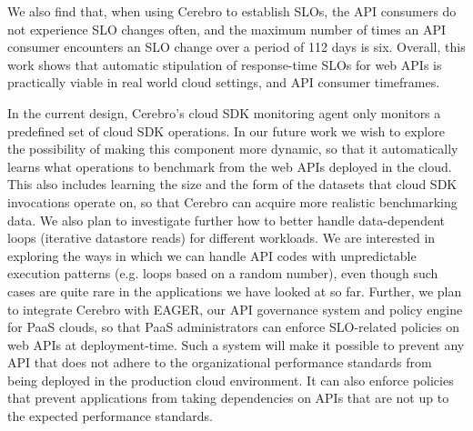 We also find that, when using Cerebro to establish SLOs, the API consumers do not 
experience SLO changes often, and the maximum
number of times an API consumer encounters an SLO change over a period of 112 days is six.
Overall, this work shows that automatic stipulation of response-time SLOs for web APIs is practically
viable in real world cloud settings, and API consumer timeframes.

In the current design, Cerebro's cloud SDK monitoring agent only monitors 
a predefined set of cloud SDK operations. In our future work we wish 
to explore the possibility of making this component more dynamic,
so that it automatically learns what operations to benchmark from the web APIs 
deployed in the cloud. This also includes learning the size and the form of the datasets
that cloud SDK invocations operate on, so that Cerebro can acquire more realistic
benchmarking data. We also plan to investigate further how to better
handle data-dependent loops (iterative datastore reads) for different workloads. We are interested
in exploring the ways in which we can handle API codes with unpredictable execution patterns (e.g.
loops based on a random number), even though such cases are quite rare in the applications we
have looked at so far.
Further, we plan
to integrate Cerebro with EAGER, our API governance system 
and policy engine for PaaS clouds, so 
that PaaS administrators can enforce SLO-related policies on web APIs at deployment-time.
Such a system will make it possible to prevent any API that 
does not adhere to the organizational performance
standards from being deployed in the production cloud environment. It can 
also enforce policies that prevent applications from taking dependencies on APIs
that are not up to the expected performance standards.